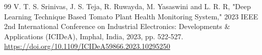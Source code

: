 \documentclass[pdflatex,sn-mathphys-num,iicol]{sn-jnl} %
\theoremstyle{thmstyleone}
\theoremstyle{thmstyletwo}
\theoremstyle{thmstylethree}
\begin{document}
\begin{thebibliography}{99}
 V. T. S. Srinivas, J. S. Teja, R. Ruwayda, M. Yasaswini and L. R. R, "Deep Learning Technique Based Tomato Plant Health Monitoring System," 2023 IEEE 2nd International Conference on Industrial Electronics: Developments \& Applications (ICIDeA), Imphal, India, 2023, pp. 522-527. \url{https://doi.org/10.1109/ICIDeA59866.2023.10295250}



\end{thebibliography}
\end{document}
